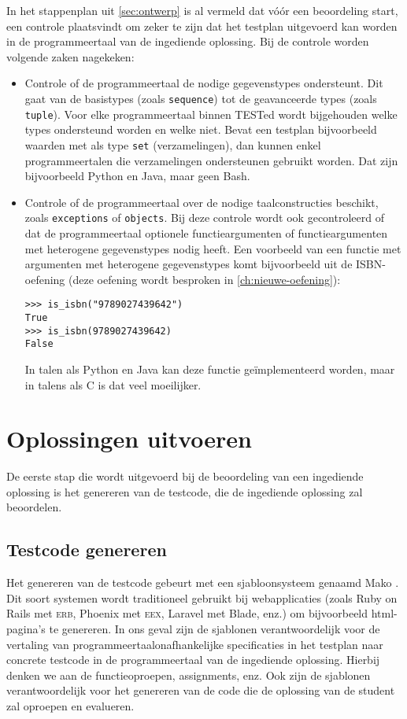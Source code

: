 In het stappenplan uit \cref{sec:ontwerp} is al vermeld dat vóór een beoordeling start, een controle plaatsvindt om zeker te zijn dat het testplan uitgevoerd kan worden in de programmeertaal van de ingediende oplossing.
Bij de controle worden volgende zaken nagekeken:
\begin{itemize}
    \item Controle of de programmeertaal de nodige gegevenstypes ondersteunt.
    Dit gaat van de basistypes (zoals \texttt{sequence}) tot de geavanceerde types (zoals \texttt{tuple}).
    Voor elke programmeertaal binnen TESTed wordt bijgehouden welke types ondersteund worden en welke niet.
    Bevat een testplan bijvoorbeeld waarden met als type \texttt{set} (verzamelingen), dan kunnen enkel programmeertalen die verzamelingen ondersteunen gebruikt worden.
    Dat zijn bijvoorbeeld Python en Java, maar geen Bash.
    \item Controle of de programmeertaal over de nodige taalconstructies beschikt, zoals \texttt{exceptions} of \texttt{objects}.
    Bij deze controle wordt ook gecontroleerd of dat de programmeertaal optionele functieargumenten of functieargumenten met heterogene gegevenstypes nodig heeft.
    Een voorbeeld van een functie met argumenten met heterogene gegevenstypes komt bijvoorbeeld uit de ISBN-oefening (deze oefening wordt besproken in \cref{ch:nieuwe-oefening}):
    \begin{verbatim}
>>> is_isbn("9789027439642")
True
>>> is_isbn(9789027439642)
False
    \end{verbatim}
    In talen als Python en Java kan deze functie geïmplementeerd worden, maar in talens als C is dat veel moeilijker.
\end{itemize}

\section{Oplossingen uitvoeren}\label{sec:oplossingen-uitvoeren}

De eerste stap die wordt uitgevoerd bij de beoordeling van een ingediende oplossing is het genereren van de testcode, die de ingediende oplossing zal beoordelen.

\subsection{Testcode genereren}\label{subsec:testcode-genereren}

Het genereren van de testcode gebeurt met een sjabloonsysteem genaamd Mako \autocite{mako}.
Dit soort systemen wordt traditioneel gebruikt bij webapplicaties (zoals Ruby on Rails met \textsc{erb}, Phoenix met \textsc{eex}, Laravel met Blade, enz.) om bijvoorbeeld html-pagina's te genereren.
In ons geval zijn de sjablonen verantwoordelijk voor de vertaling van programmeertaalonafhankelijke specificaties in het testplan naar concrete testcode in de programmeertaal van de ingediende oplossing.
Hierbij denken we aan de functieoproepen, assignments, enz.
Ook zijn de sjablonen verantwoordelijk voor het genereren van de code die de oplossing van de student zal oproepen en evalueren.

